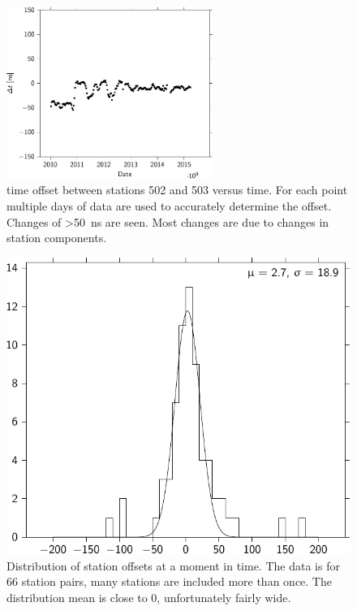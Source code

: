 \begin{figure}
    \centering
    \includegraphics[width=0.6\textwidth]
                    {plots/cluster/offsets_ref502_503_pairs}
    \caption{\gps time offset between stations 502 and 503 versus time. For each point multiple days of data are used to accurately determine the offset. Changes of \SI{>50}{\ns} are seen. Most changes are due to changes in station components.}
    \label{fig:offsets_ref502_503_pairss}
\end{figure}

\begin{figure}
    \centering
    \includegraphics{plots/cluster/offset_distribution}
    \caption{Distribution of station offsets at a moment in time. The data is for 66 station pairs, many stations are included more than once. The distribution mean is close to 0, unfortunately fairly wide.}
    \label{fig:setup}
\end{figure}


